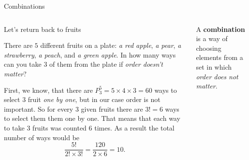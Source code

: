 \documentclass[9pt,aspectratio=169]{beamer}
\begin{document}
\begin{frame}{Combinations}
  \begin{columns}[T]
    \begin{column}{0.5\textwidth}
      Let’s return back to fruits

      \begin{problem}
        There are $5$ different fruits on a plate: \emph{a red apple}, \emph{a pear}, \emph{a strawberry}, \emph{a peach}, and \emph{a green apple}. In how many ways can you take $3$ of them from the plate if \emph{order doesn’t matter}?
      \end{problem}

      \begin{nscenter}
      \end{nscenter}

      First, we know, that there are $P_3^5 = 5 \times 4 \times 3 = 60$ ways to select $3$ fruit \emph{one by one}, but in our case order is not important. So for every $3$ given fruits there are $3! = 6$ ways to select them them one by one. That means that each way to take $3$ fruits was counted $6$ times. As a result the total number of ways would be 
      \[
        \frac{5!}{2! \times 3!} = \frac{120}{2 \times 6} = 10.
      \]
    \end{column}
    \begin{column}{0.5\textwidth}
      \begin{definition}
        A \textbf{combination} is a way of choosing elements from a set in which \emph{order does not matter}.
      \end{definition}


\end{column}
\end{columns}
\end{frame}
\end{document}
